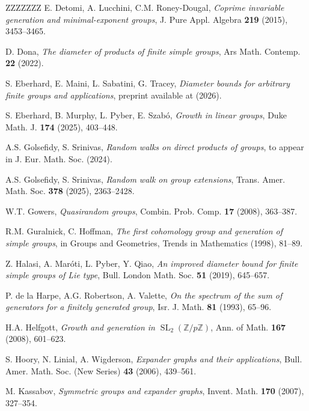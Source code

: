 \documentclass[11pt,reqno]{amsart}
\numberwithin{equation}{section}
\theoremstyle{definition}
\theoremstyle{remark}
\newcommand{\SL}{\mathop{\mathrm{SL}}}
\newcommand{\MYhref}[3][black]{\href{#2}{\color{#1}{#3}}}%
\begin{document}
\begin{thebibliography}{ZZZZZZZ}
 E. Detomi, A. Lucchini, C.M. Roney-Dougal,
\textit{Coprime invariable generation and minimal-exponent groups},
J. Pure Appl. Algebra \textbf{219} (2015), 3453--3465.

 D. Dona,
\textit{The diameter of products of finite simple groups},
Ars Math. Contemp. \textbf{22} (2022).

 S. Eberhard, E. Maini, L. Sabatini, G. Tracey,
\textit{Diameter bounds for arbitrary finite groups and applications},
preprint available at \texttt{\MYhref[mypink]{https://arxiv.org/pdf/2604.15303}{arxiv.org/pdf/2604.15303}} (2026).
  
 S. Eberhard, B. Murphy, L. Pyber, E. Szab\'o,
\textit{Growth in linear groups},
Duke Math. J. \textbf{174} (2025), 403--448.

 A.S. Golsefidy, S. Srinivas,
\textit{Random walks on direct products of groups},
to appear in J. Eur. Math. Soc. (2024).

 A.S. Golsefidy, S. Srinivas,
\textit{Random walk on group extensions},
Trans. Amer. Math. Soc. \textbf{378} (2025), 2363--2428.

 W.T. Gowers,
\textit{Quasirandom groups},
Combin. Prob. Comp. \textbf{17} (2008), 363--387.

 R.M. Guralnick, C. Hoffman,
\textit{The first cohomology group and generation of simple groups},
in Groups and Geometries, Trends in Mathematics (1998), 81--89.

 Z. Halasi, A. Mar\'oti, L. Pyber, Y. Qiao,
\textit{An improved diameter bound for finite simple groups of Lie type},
Bull. London Math. Soc. \textbf{51} (2019), 645--657.

 P. de la Harpe, A.G. Robertson, A. Valette,
\textit{On the spectrum of the sum of generators for a finitely generated group},
Isr. J. Math. \textbf{81} (1993), 65--96.

 H.A. Helfgott,
\textit{Growth and generation in $\SL_2(\mathbb{Z}/p\mathbb{Z})$},
Ann. of Math. \textbf{167} (2008), 601--623.

 S. Hoory, N. Linial, A. Wigderson,
\textit{Expander graphs and their applications},
Bull. Amer. Math. Soc. (New Series) \textbf{43} (2006), 439--561.

 M. Kassabov,
\textit{Symmetric groups and expander graphs},
Invent. Math. \textbf{170} (2007), 327--354.


\end{thebibliography}
\end{document}
